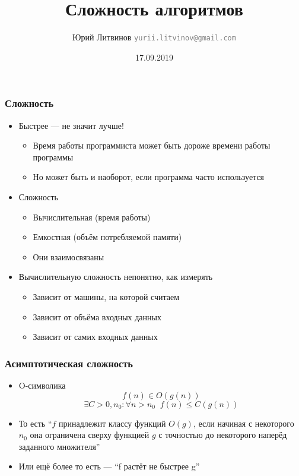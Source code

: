 \documentclass[xetex,mathserif,serif]{beamer}
\title{Сложность алгоритмов}
\author[Юрий Литвинов]{Юрий Литвинов \newline \textcolor{gray}{\small\texttt{yurii.litvinov@gmail.com}}}
\date{17.09.2019}
\begin{document}
	
	\frame{\titlepage}
	
	\begin{frame}
		\frametitle{Сложность}
		\begin{itemize}
			\item Быстрее --- не значит лучше!
			\begin{itemize}
				\item Время работы программиста может быть дороже времени работы программы
				\item Но может быть и наоборот, если программа часто используется
			\end{itemize}
			\item Сложность
			\begin{itemize}
				\item Вычислительная (время работы)
				\item Емкостная (объём потребляемой памяти)
				\item Они взаимосвязаны
			\end{itemize}
			\item Вычислительную сложность непонятно, как измерять
			\begin{itemize}
				\item Зависит от машины, на которой считаем
				\item Зависит от объёма входных данных
				\item Зависит от самих входных данных
			\end{itemize}
		\end{itemize}
	\end{frame}

	\begin{frame}
		\frametitle{Асимптотическая сложность}
		\begin{itemize}
			\item O-символика
			$$f(n) \in O(g(n))$$
			$$\exists C > 0, n_0 : \forall n > n_0\;\; f(n) \leq C(g(n))$$
			\item То есть ``$f$ принадлежит классу функций $O(g)$, если начиная с некоторого $n_0$ она ограничена сверху функцией $g$ с точностью до некоторого наперёд заданного множителя''
			\item Или ещё более то есть --- ``f растёт не быстрее g''
		\end{itemize}
	\end{frame}
\end{document}
